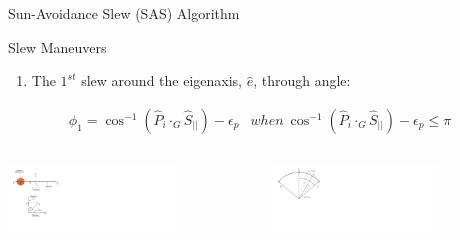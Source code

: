 \documentclass{beamer}
\begin{document}
\begin{frame}{Sun-Avoidance Slew (SAS) Algorithm}
\begin{block}{Slew Maneuvers}
\begin{enumerate}
\item The $1^{st}$ slew around the eigenaxis, $\hat{e}$, through angle:
\end{enumerate}
\begin{equation}
	\begin{array}{lr}
		\phi_1 = \cos^{-1}(\hat{P}_i\cdot_G\hat{S}_{||})-\epsilon_p & {\scriptstyle when}\  \cos^{-1}(\hat{P}_i\cdot_G\hat{S}_{||})-\epsilon_p\leq \pi
	\end{array}
\end{equation}
\begin{columns}
	\begin{column}{0.5\textwidth}  %
		\begin{center}
			\includegraphics[width=1.75in]{./Figures/SVAS_1rb_modified}
		\end{center}
	\end{column}
	\begin{column}{0.5\textwidth}
		\begin{center}
			\includegraphics[width=1.75in]{./Figures/SVAS_1r_modified}
		\end{center}
	\end{column}
\end{columns}
\end{block}
\end{frame}
\end{document}
